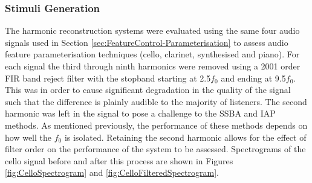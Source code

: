 		\subsubsection*{Stimuli Generation}
			The harmonic reconstruction systems were evaluated using the same four audio signals used in
			Section \ref{sec:FeatureControl-Parameterisation} to assess audio feature parameterisation
			techniques (cello, clarinet, synthesised and piano). For each signal the third through ninth
			harmonics were removed using a 2001 order FIR band reject filter with the stopband
			starting at 2.5$f_{0}$ and ending at 9.5$f_{0}$. This was in order to cause significant degradation
			in the quality of the signal such that the difference is plainly audible to the majority of
			listeners. The second harmonic was left in the signal to pose a challenge to the SSBA and IAP
			methods. As mentioned previously, the performance of these methods depends on how well the $f_{0}$
			is isolated.  Retaining the second harmonic allows for the effect of filter order on the
			performance of the system to be assessed. Spectrograms of the cello signal before and after this
			process are shown in Figures \ref{fig:CelloSpectrogram} and \ref{fig:CelloFilteredSpectrogram}. 

